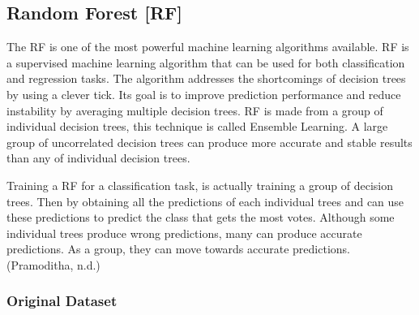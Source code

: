 \documentclass[
]{article}
\newenvironment{Shaded}{\begin{snugshade}}{\end{snugshade}}
\newcommand{\CommentTok}[1]{\textcolor[rgb]{0.56,0.35,0.01}{\textit{#1}}}
\newcommand{\DataTypeTok}[1]{\textcolor[rgb]{0.13,0.29,0.53}{#1}}
\newcommand{\KeywordTok}[1]{\textcolor[rgb]{0.13,0.29,0.53}{\textbf{#1}}}
\newcommand{\NormalTok}[1]{#1}
\newcommand{\OperatorTok}[1]{\textcolor[rgb]{0.81,0.36,0.00}{\textbf{#1}}}
\newcommand{\StringTok}[1]{\textcolor[rgb]{0.31,0.60,0.02}{#1}}
\begin{document}
\hypertarget{random-forest-rf}{%
\subsection{Random Forest {[}RF{]}}\label{random-forest-rf}}

The RF is one of the most powerful machine learning algorithms
available. RF is a supervised machine learning algorithm that can be
used for both classification and regression tasks. The algorithm
addresses the shortcomings of decision trees by using a clever tick. Its
goal is to improve prediction performance and reduce instability by
averaging multiple decision trees. RF is made from a group of individual
decision trees, this technique is called Ensemble Learning. A large
group of uncorrelated decision trees can produce more accurate and
stable results than any of individual decision trees.

Training a RF for a classification task, is actually training a group of
decision trees. Then by obtaining all the predictions of each individual
trees and can use these predictions to predict the class that gets the
most votes. Although some individual trees produce wrong predictions,
many can produce accurate predictions. As a group, they can move towards
accurate predictions. (Pramoditha, n.d.)

\hypertarget{original-dataset-2}{%
\subsubsection{Original Dataset}\label{original-dataset-2}}

\begin{Shaded}
\end{Shaded}
\end{document}
